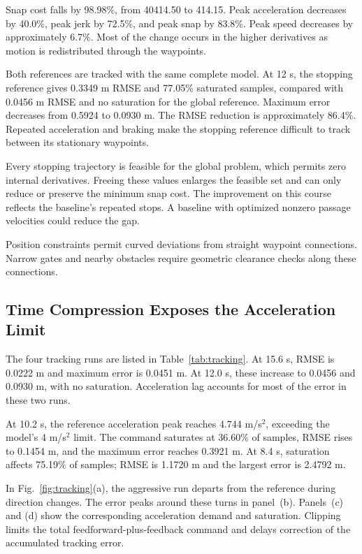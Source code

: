 \documentclass[letterpaper,10pt,conference]{ieeeconf}
\begin{document}
Snap cost falls by 98.98\%, from 40414.50 to 414.15.
Peak acceleration decreases by 40.0\%, peak jerk by 72.5\%, and peak snap by 83.8\%.
Peak speed decreases by approximately 6.7\%.
Most of the change occurs in the higher derivatives as motion is redistributed through the waypoints.

Both references are tracked with the same complete model.
At 12 s, the stopping reference gives 0.3349 m RMSE and 77.05\% saturated samples, compared with 0.0456 m RMSE and no saturation for the global reference.
Maximum error decreases from 0.5924 to 0.0930 m.
The RMSE reduction is approximately 86.4\%.
Repeated acceleration and braking make the stopping reference difficult to track between its stationary waypoints.

Every stopping trajectory is feasible for the global problem, which permits zero internal derivatives.
Freeing these values enlarges the feasible set and can only reduce or preserve the minimum snap cost.
The improvement on this course reflects the baseline's repeated stops.
A baseline with optimized nonzero passage velocities could reduce the gap.

Position constraints permit curved deviations from straight waypoint connections.
Narrow gates and nearby obstacles require geometric clearance checks along these connections.
\subsection{Time Compression Exposes the Acceleration Limit}
The four tracking runs are listed in Table~\ref{tab:tracking}.
At 15.6 s, RMSE is 0.0222 m and maximum error is 0.0451 m.
At 12.0 s, these increase to 0.0456 and 0.0930 m, with no saturation.
Acceleration lag accounts for most of the error in these two runs.

At 10.2 s, the reference acceleration peak reaches 4.744 m/s$^2$, exceeding the model's 4 m/s$^2$ limit.
The command saturates at 36.60\% of samples, RMSE rises to 0.1454 m, and the maximum error reaches 0.3921 m.
At 8.4 s, saturation affects 75.19\% of samples; RMSE is 1.1720 m and the largest error is 2.4792 m.

In Fig.~\ref{fig:tracking}(a), the aggressive run departs from the reference during direction changes.
The error peaks around these turns in panel~(b).
Panels~(c) and (d) show the corresponding acceleration demand and saturation.
Clipping limits the total feedforward-plus-feedback command and delays correction of the accumulated tracking error.
\end{document}
